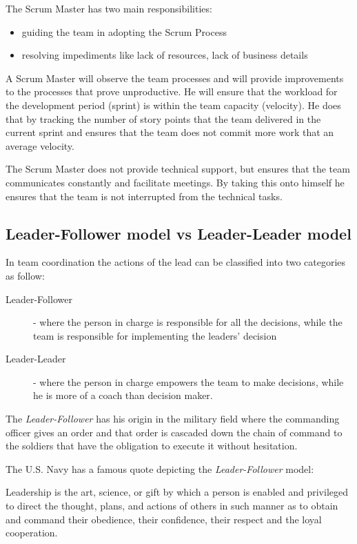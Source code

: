 The Scrum Master has two main responsibilities:

\begin{itemize}
\item guiding the team in adopting the Scrum Process
\item resolving impediments like lack of resources, lack of business details
\end{itemize}

A Scrum Master will observe the team processes and will provide improvements to the processes that prove unproductive. He will ensure that the workload for the development period (sprint) is within the team capacity (velocity). He does that by tracking the number of story points that the team delivered in the current sprint and ensures that the team does not commit more work that an average velocity.

The Scrum Master does not provide technical support, but ensures that the team communicates constantly and facilitate meetings. By taking this onto himself he ensures that the team is not interrupted from the technical tasks.

\subsection{Leader-Follower model vs Leader-Leader model}

In team coordination the actions of the lead can be classified into two categories as follow:

\begin{description}
\item [Leader-Follower] - where the person in charge is responsible for all the decisions, while the team is responsible for implementing the leaders' decision
\item [Leader-Leader] - where the person in charge empowers the team to make decisions, while he is more of a coach than decision maker.
\end{description}

The \textit{Leader-Follower} has his origin in the military field where the commanding officer gives an order and that order is cascaded down the chain of command to the soldiers that have the obligation to execute it without hesitation. 

The U.S. Navy has a famous quote depicting the \textit{Leader-Follower} model:

\begin{displayquote}
Leadership is the art, science, or gift by which a person is enabled and privileged to direct the thought, plans, and actions of others in such manner as to obtain and command their obedience, their confidence, their respect and the loyal cooperation. \cite{fundamentals-of-naval-leadership}
\end{displayquote}

